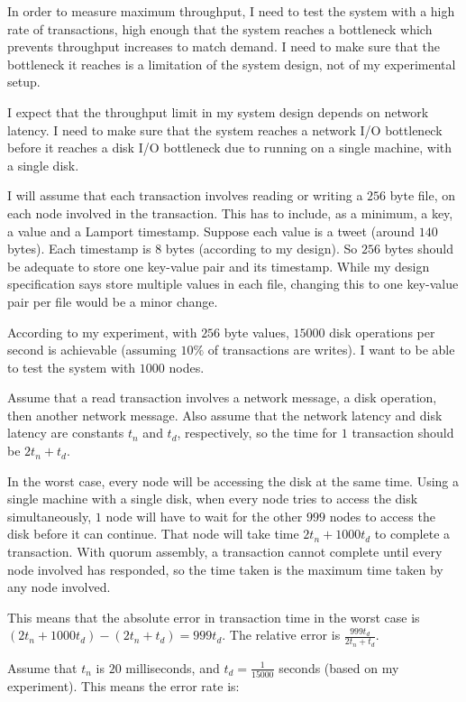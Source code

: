 \documentclass[12pt,a4paper]{article}
\begin{document}
In order to measure maximum throughput, I need to test the system with a high rate of transactions, high enough that the system reaches a bottleneck which prevents throughput increases to match demand. I need to make sure that the bottleneck it reaches is a limitation of the system design, not of my experimental setup.

I expect that the throughput limit in my system design depends on network latency. I need to make sure that the system reaches a network I/O bottleneck before it reaches a disk I/O bottleneck due to running on a single machine, with a single disk.

I will assume that each transaction involves reading or writing a $256$ byte file, on each node involved in the transaction. This has to include, as a minimum, a key, a value and a Lamport timestamp. Suppose each value is a tweet (around $140$ bytes). Each timestamp is $8$ bytes (according to my design). So $256$ bytes should be adequate to store one key-value pair and its timestamp. While my design specification says store multiple values in each file, changing this to one key-value pair per file would be a minor change.

According to my experiment, with $256$ byte values, $15000$ disk operations per second is achievable (assuming $10\%$ of transactions are writes). I want to be able to test the system with $1000$ nodes.

Assume that a read transaction involves a network message, a disk operation, then another network message. Also assume that the network latency and disk latency are constants $t_n$ and $t_d$, respectively, so the time for $1$ transaction should be $2t_n + t_d$.

In the worst case, every node will be accessing the disk at the same time. Using a single machine with a single disk, when every node tries to access the disk simultaneously, $1$ node will have to wait for the other $999$ nodes to access the disk before it can continue. That node will take time $2t_n + 1000t_d$ to complete a transaction. With quorum assembly, a transaction cannot complete until every node involved has responded, so the time taken is the maximum time taken by any node involved.

This means that the absolute error in transaction time in the worst case is $(2t_n + 1000t_d) - (2t_n + t_d) = 999t_d$. The relative error is $\frac{999t_d}{2t_n + t_d}$.

Assume that $t_n$ is $20$ milliseconds, and $t_d = \frac{1}{15000}$ seconds (based on my experiment). This means the error rate is:
\end{document}
